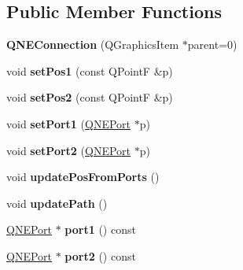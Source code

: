 \subsection*{Public Member Functions}
\begin{DoxyCompactItemize}
\item 
\hypertarget{class_q_n_e_connection_ae447737e149634f2f84f0edb184a3121}{{\bfseries Q\-N\-E\-Connection} (Q\-Graphics\-Item $\ast$parent=0)}\label{class_q_n_e_connection_ae447737e149634f2f84f0edb184a3121}

\item 
\hypertarget{class_q_n_e_connection_a96df4410d2cdd3896aef2adaa413fdca}{void {\bfseries set\-Pos1} (const Q\-Point\-F \&p)}\label{class_q_n_e_connection_a96df4410d2cdd3896aef2adaa413fdca}

\item 
\hypertarget{class_q_n_e_connection_a584ee43f408436b16dfded5820278ad8}{void {\bfseries set\-Pos2} (const Q\-Point\-F \&p)}\label{class_q_n_e_connection_a584ee43f408436b16dfded5820278ad8}

\item 
\hypertarget{class_q_n_e_connection_aafc7639063c58d3f5ef68e79427ac892}{void {\bfseries set\-Port1} (\hyperlink{class_q_n_e_port}{Q\-N\-E\-Port} $\ast$p)}\label{class_q_n_e_connection_aafc7639063c58d3f5ef68e79427ac892}

\item 
\hypertarget{class_q_n_e_connection_ab756e8136042cbe398264d8e0300497f}{void {\bfseries set\-Port2} (\hyperlink{class_q_n_e_port}{Q\-N\-E\-Port} $\ast$p)}\label{class_q_n_e_connection_ab756e8136042cbe398264d8e0300497f}

\item 
\hypertarget{class_q_n_e_connection_a8ac846bb2d6ca3eb3a450a4652cbbe2e}{void {\bfseries update\-Pos\-From\-Ports} ()}\label{class_q_n_e_connection_a8ac846bb2d6ca3eb3a450a4652cbbe2e}

\item 
\hypertarget{class_q_n_e_connection_a98793e21093dde710079b2f2a0937b12}{void {\bfseries update\-Path} ()}\label{class_q_n_e_connection_a98793e21093dde710079b2f2a0937b12}

\item 
\hypertarget{class_q_n_e_connection_a8b9fcbe74b6c263d0a15235be768c195}{\hyperlink{class_q_n_e_port}{Q\-N\-E\-Port} $\ast$ {\bfseries port1} () const }\label{class_q_n_e_connection_a8b9fcbe74b6c263d0a15235be768c195}

\item 
\hypertarget{class_q_n_e_connection_a4092be01cd41c35fe57912ed68a5cf8e}{\hyperlink{class_q_n_e_port}{Q\-N\-E\-Port} $\ast$ {\bfseries port2} () const }\label{class_q_n_e_connection_a4092be01cd41c35fe57912ed68a5cf8e}


\end{DoxyCompactItemize}
